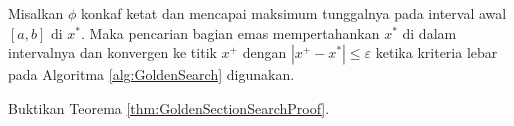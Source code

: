 \begin{algorithm}
\caption{Pencarian Bagian Emas}
\label{alg:GoldenSearch}
\noindent{}
\end{algorithm}

\begin{theorem} Misalkan $\phi$ konkaf ketat dan mencapai maksimum tunggalnya pada interval awal $[a,b]$ di $x^*$. Maka pencarian bagian emas mempertahankan $x^*$ di dalam intervalnya dan konvergen ke titik $x^+$ dengan $|x^+-x^*|\leq\varepsilon$ ketika kriteria lebar pada Algoritma \ref{alg:GoldenSearch} digunakan.
\label{thm:GoldenSectionSearchProof}
\end{theorem}

\begin{exercise} Buktikan Teorema \ref{thm:GoldenSectionSearchProof}.
\end{exercise}

